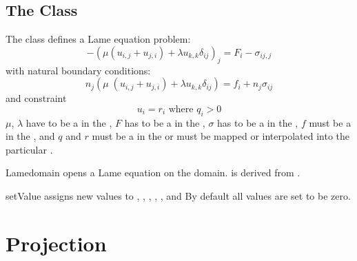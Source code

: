 \subsection{The \Lame Class}
The \Lame class defines a Lame equation problem:
\begin{equation}\label{LE.1}
-(\mu (u_{i,j}+u_{j,i})+\lambda u_{k,k}\delta_{ij})_{j} = F_{i}-\sigma_{ij,j}
\end{equation}
with natural boundary conditions:
\begin{equation}\label{LE.2}
n_{j}(\mu \; (u_{i,j}+u_{j,i})+\lambda u_{k,k}\delta_{ij}) = f_{i}+n_{j}\sigma_{ij}
\end{equation}
and constraint
\begin{equation}\label{LE.3}
u_{i}=r_{i} \mbox{ where } q_{i}>0
\end{equation}
$\mu$, $\lambda$ have to be a \Scalar in the \Function,
$F$ has to be a \Vector in the \Function,
$\sigma$ has to be a \Tensor in the \Function,
$f$ must be a \Vector in  the \FunctionOnBoundary,
and $q$ and $r$ must be a \Vector in  the \SolutionFS or must be mapped or interpolated into the particular \FunctionSpace.

\begin{classdesc}{Lame}{domain}
opens a Lame equation on the \Domain domain. \Lame is derived from \LinearPDE.
\end{classdesc}
\begin{methoddesc}[Lame]{setValue}{       }
assigns new values to 
,
,
,
,
,
 and
By default all values are set to be zero.
\end{methoddesc}



\section{Projection}
\label{SEC Projection}


